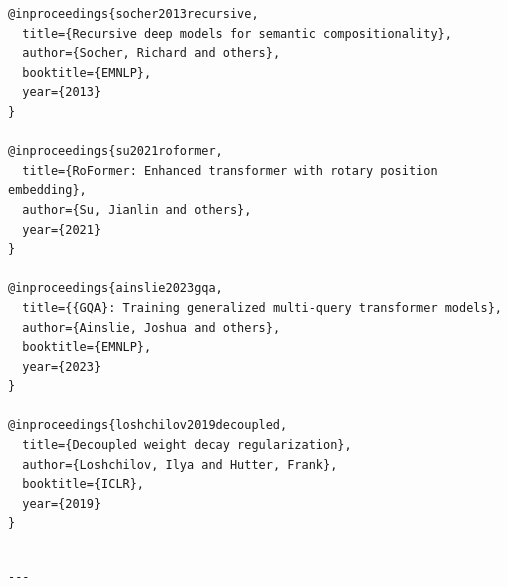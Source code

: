 \begin{lstlisting}
@inproceedings{socher2013recursive,
  title={Recursive deep models for semantic compositionality},
  author={Socher, Richard and others},
  booktitle={EMNLP},
  year={2013}
}

@inproceedings{su2021roformer,
  title={RoFormer: Enhanced transformer with rotary position embedding},
  author={Su, Jianlin and others},
  year={2021}
}

@inproceedings{ainslie2023gqa,
  title={{GQA}: Training generalized multi-query transformer models},
  author={Ainslie, Joshua and others},
  booktitle={EMNLP},
  year={2023}
}

@inproceedings{loshchilov2019decoupled,
  title={Decoupled weight decay regularization},
  author={Loshchilov, Ilya and Hutter, Frank},
  booktitle={ICLR},
  year={2019}
}
\end{lstlisting}
\begin{lstlisting}

---
\end{lstlisting}